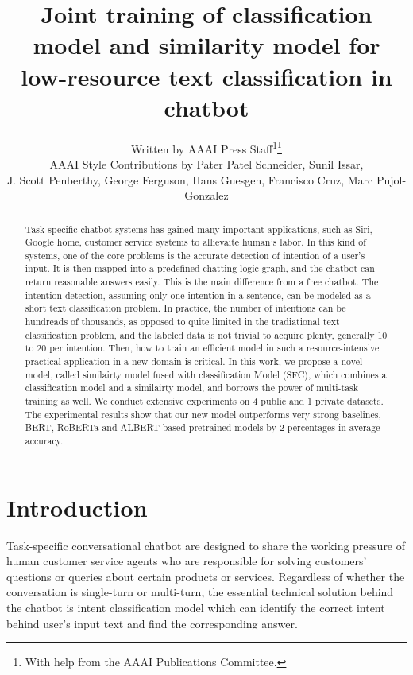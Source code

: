 \documentclass[letterpaper]{article} %
\title{     
  Joint training of classification model and similarity model for low-resource
  text classification in chatbot
}
\author{
  Written by AAAI Press Staff\textsuperscript{\rm 1}\thanks{With help from the AAAI Publications Committee.}\\
  AAAI Style Contributions by Pater Patel Schneider,
  Sunil Issar,  \\
  J. Scott Penberthy,
  George Ferguson,
  Hans Guesgen,
  Francisco Cruz,
  Marc Pujol-Gonzalez
  \\
}
\begin{document}
  \maketitle

  \begin{abstract}
    Task-specific  chatbot  systems has gained many important applications, such
    as  Siri, Google home, customer service systems to allievaite human's labor.
    In  this  kind  of  systems, one of the core problems is the accurate detection of
    intention  of  a  user's input. It is then mapped into a predefined chatting
    logic  graph,  and the chatbot can return reasonable answers easily. This is
    the  main  difference from a free chatbot. The intention detection, assuming
    only  one  intention  in  a  sentence,  can  be  modeled  as  a  short  text
    classification  problem.  In  practice,  the  number  of  intentions  can be
    hundreads of thousands, as opposed to quite limited in the tradiational text
    classification  problem,  and  the  labeled  data  is not trivial to acquire
    plenty,  generally  10  to 20 per intention. Then, how to train an efficient
    model  in such a resource-intensive practical application in a new domain is
    critical.  In  this  work, we propose a novel model, called similairty model
    fused with classification Model (SFC), which combines a classification model
    and  a  similairty  model,  and  borrows the power of multi-task training as
    well.  We  conduct extensive experiments on 4 public and 1 private datasets.
    The  experimental  results  show  that our new model outperforms very strong
    baselines, BERT, RoBERTa and ALBERT based pretrained models by 2 percentages
    in average accuracy.

  \end{abstract}

  \section{Introduction}
  \label{sec:intro}

  Task-specific  conversational  chatbot  \cite{wen2016network}  are  designed  to
  share   the  working  pressure  of  human  customer  service  agents  who  are
  responsible for solving customers' questions or queries about certain products
  or  services.  Regardless  of  whether  the  conversation  is  single-turn  or
  multi-turn,  the  essential  technical  solution  behind the chatbot is intent
  classification model which can identify the correct intent behind user's input
  text and find the corresponding answer.
\end{document}
